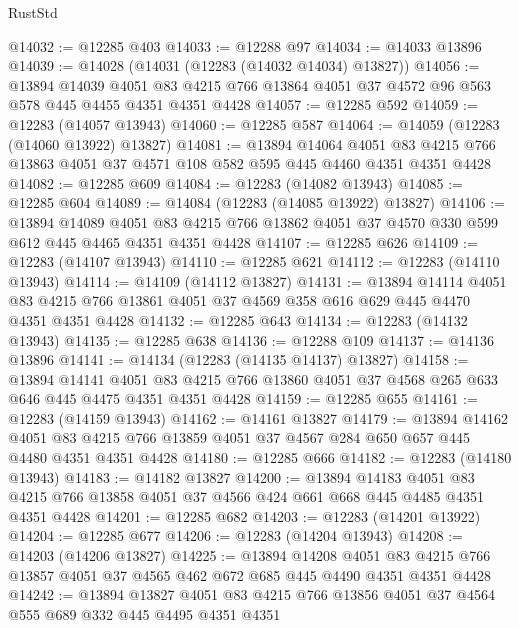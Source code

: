 \begin{lexlean}{RustStd}
\begin{coremodule}
@14032 := @12285 @403
@14033 := @12288 @97
@14034 := @14033 @13896
@14039 := @14028 (@14031 (@12283 (@14032 @14034) @13827))
@14056 := @13894
    @14039
    @4051
    @83
    @4215
    @766
    @13864
    @4051
    @37
    @4572
    @96
    @563
    @578
    @445
    @4455
    @4351
    @4351
    @4428
@14057 := @12285 @592
@14059 := @12283 (@14057 @13943)
@14060 := @12285 @587
@14064 := @14059 (@12283 (@14060 @13922) @13827)
@14081 := @13894
    @14064
    @4051
    @83
    @4215
    @766
    @13863
    @4051
    @37
    @4571
    @108
    @582
    @595
    @445
    @4460
    @4351
    @4351
    @4428
@14082 := @12285 @609
@14084 := @12283 (@14082 @13943)
@14085 := @12285 @604
@14089 := @14084 (@12283 (@14085 @13922) @13827)
@14106 := @13894
    @14089
    @4051
    @83
    @4215
    @766
    @13862
    @4051
    @37
    @4570
    @330
    @599
    @612
    @445
    @4465
    @4351
    @4351
    @4428
@14107 := @12285 @626
@14109 := @12283 (@14107 @13943)
@14110 := @12285 @621
@14112 := @12283 (@14110 @13943)
@14114 := @14109 (@14112 @13827)
@14131 := @13894
    @14114
    @4051
    @83
    @4215
    @766
    @13861
    @4051
    @37
    @4569
    @358
    @616
    @629
    @445
    @4470
    @4351
    @4351
    @4428
@14132 := @12285 @643
@14134 := @12283 (@14132 @13943)
@14135 := @12285 @638
@14136 := @12288 @109
@14137 := @14136 @13896
@14141 := @14134 (@12283 (@14135 @14137) @13827)
@14158 := @13894
    @14141
    @4051
    @83
    @4215
    @766
    @13860
    @4051
    @37
    @4568
    @265
    @633
    @646
    @445
    @4475
    @4351
    @4351
    @4428
@14159 := @12285 @655
@14161 := @12283 (@14159 @13943)
@14162 := @14161 @13827
@14179 := @13894
    @14162
    @4051
    @83
    @4215
    @766
    @13859
    @4051
    @37
    @4567
    @284
    @650
    @657
    @445
    @4480
    @4351
    @4351
    @4428
@14180 := @12285 @666
@14182 := @12283 (@14180 @13943)
@14183 := @14182 @13827
@14200 := @13894
    @14183
    @4051
    @83
    @4215
    @766
    @13858
    @4051
    @37
    @4566
    @424
    @661
    @668
    @445
    @4485
    @4351
    @4351
    @4428
@14201 := @12285 @682
@14203 := @12283 (@14201 @13922)
@14204 := @12285 @677
@14206 := @12283 (@14204 @13943)
@14208 := @14203 (@14206 @13827)
@14225 := @13894
    @14208
    @4051
    @83
    @4215
    @766
    @13857
    @4051
    @37
    @4565
    @462
    @672
    @685
    @445
    @4490
    @4351
    @4351
    @4428
@14242 := @13894
    @13827
    @4051
    @83
    @4215
    @766
    @13856
    @4051
    @37
    @4564
    @555
    @689
    @332
    @445
    @4495
    @4351
    @4351

\end{coremodule}
\end{lexlean}
